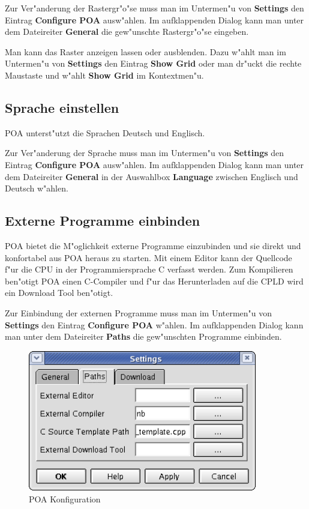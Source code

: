 \documentclass[a4paper,titlepage,12pt,ngerman]{scrbook}
\begin{document}
Zur Ver"anderung der Rastergr"o"se muss man im Untermen"u von {\bf Settings} den Eintrag {\bf Configure POA} ausw"ahlen. Im aufklappenden Dialog kann man unter dem Dateireiter {\bf General} die gew"unschte Rastergr"o"se eingeben.\par
Man kann das Raster anzeigen lassen oder ausblenden. Dazu w"ahlt man im Untermen"u von {\bf Settings} den Eintrag {\bf Show Grid} oder man dr"uckt die rechte Maustaste und w"ahlt {\bf Show Grid} im Kontextmen"u.


\subsection{Sprache einstellen}
POA unterst"utzt die Sprachen Deutsch und Englisch.\par
Zur Ver"anderung der Sprache muss man im Untermen"u von {\bf Settings} den Eintrag {\bf Configure POA} ausw"ahlen. Im aufklappenden Dialog kann man unter dem Dateireiter {\bf General} in der Auswahlbox {\bf Language} zwischen Englisch und Deutsch w"ahlen.\par

\subsection{Externe Programme einbinden}
POA bietet die M"oglichkeit externe Programme einzubinden und sie direkt und konfortabel aus POA heraus zu starten. Mit einem Editor kann der Quellcode f"ur die CPU in der Programmiersprache C  verfasst werden. Zum Kompilieren ben"otigt POA einen C-Compiler und f"ur das Herunterladen auf die CPLD wird ein Download Tool ben"otigt.\par
Zur Einbindung der externen Programme muss man im Untermen"u von {\bf Settings} den Eintrag {\bf Configure POA} w"ahlen. Im aufklappenden Dialog kann man unter dem Dateireiter {\bf Paths} die gew"unschten Programme einbinden.

\begin{figure}[htbp]

\begin{center}

\includegraphics[width=10cm]{POAConfiguration2}

\caption{POA Konfiguration}\label{test}

\end{center}

\end{figure}
\end{document}
